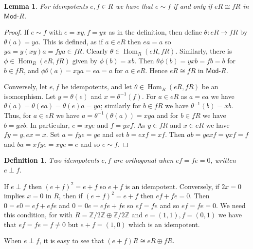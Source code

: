\documentclass[a4paper,12pt]{article}
\theoremstyle{plain}
\newtheorem{lemma}[proposition]{Lemma}
\newtheorem{definition}[proposition]{Definition}
\theoremstyle{definition}
\renewcommand{\mod}{\textsf{Mod-}}
\renewcommand{\hom}{\operatorname{Hom}}
\begin{document}
\begin{lemma}\label{lem:1}
For idempotents $e,f\in R$ we have that $e\sim f$ if and only if $eR \cong fR$ in $\mod R$.
\end{lemma}
\begin{proof}
If $e\sim f$ with $e=xy, f=yx$ as in the definition, then define $\theta:eR \rightarrow fR$ by $\theta(a) = ya$.  This is defined, as if
$a\in eR$ then $ea=a$ so $ya = y(xy)a = fya \in fR$.  Clearly $\theta\in\hom_R(eR,fR)$.  Similarly, there
is $\phi\in\hom_R(eR,fR)$ given by $\phi(b)=xb$.  Then $\theta\phi(b) = yxb = fb = b$ for $b\in fR$, and
$\phi\theta(a) = xya = ea = a$ for $a\in eR$.  Hence $eR \cong fR$ in $\mod R$.

Conversely, let $e,f$ be idempotents, and let $\theta\in\hom_R(eR,fR)$ be an isomorphism.  Let $y=\theta(e)$
and $x=\theta^{-1}(f)$.  For $a\in eR$ as $a=ea$ we have $\theta(a) = \theta(ea) = \theta(e)a = ya$; similarly
for $b\in fR$ we have $\theta^{-1}(b) = xb$.  Thus, for $a\in eR$ we have $a = \theta^{-1}(\theta(a))
= xya$ and for $b\in fR$ we have $b = yxb$.  In particular, $e=xye$ and $f=yxf$.  As $y\in fR$ and $x\in eR$ we have $fy=y, ex=x$.  Set $a = fye = ye$ and set $b = exf = xf$.  Then $ab = yexf = yxf = f$ and $ba = xfye = xye = e$ and so $e\sim f$.
\end{proof}

\begin{definition}
Two idempotents $e,f$ are \emph{orthogonal} when $ef=fe=0$, written $e \perp f$.
\end{definition}

If $e \perp f$ then $(e+f)^2=e+f$ so $e+f$ is an idempotent. Conversely, if $2x=0$ implies $x=0$ in $R$,
then if $(e+f)^2 = e+f$ then $ef+fe = 0$.  Then $0 = e0 = ef + efe$ and $0 = 0e = efe + fe$ so $ef = fe$
and so $ef = fe = 0$.  We need this condition, for with $R = \mathbb Z / 2\mathbb Z \oplus \mathbb Z / 2\mathbb Z$
and $e=(1,1), f=(0,1)$ we have that $ef = fe = f\not=0$ but $e+f = (1,0)$ which is an idempotent.

When $e\perp f$, it is easy to see that $(e+f)R \cong eR \oplus fR$.
\end{document}
